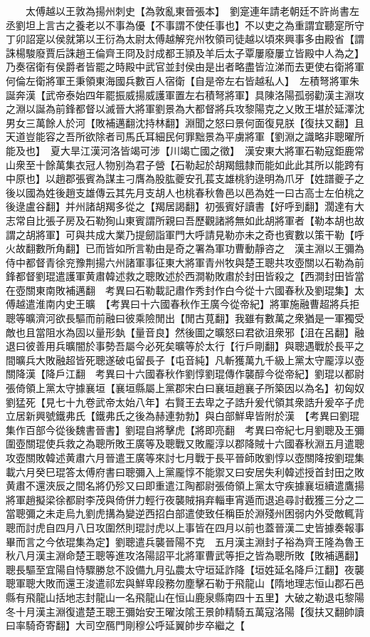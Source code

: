 　　太傅越以王敦為揚州刺史【為敦亂東晉張本】　劉寔連年請老朝廷不許尚書左丞劉坦上言古之養老以不事為優【不事謂不使任事也】不以吏之為重謂宜聽寔所守丁卯詔寔以侯就第以王衍為太尉太傅越解兖州牧領司徒越以頃來興事多由殿省【謂誅楊駿廢賈后誅趙王倫齊王冏及討成都王頴及羊后太子覃屢廢屢立皆殿中人為之】乃奏宿衛有侯爵者皆罷之時殿中武官並封侯由是出者略盡皆泣涕而去更使右衛將軍何倫左衛將軍王秉領東海國兵數百人宿衛【自是帝左右皆越私人】　左積弩將軍朱誕奔漢【武帝泰始四年罷振威揚威護軍置左右積弩將軍】具陳洛陽孤弱勸漢主淵攻之淵以誕為前鋒都督以滅晉大將軍劉景為大都督將兵攻黎陽克之乂敗王堪於延澤沈男女三萬餘人於河【敗補邁翻沈持林翻】淵聞之怒曰景何面復見朕【復扶又翻】且天道豈能容之吾所欲除者司馬氏耳細民何罪黜景為平虜將軍【劉淵之識略非聰曜所能及也】　夏大旱江漢河洛皆竭可涉【川竭亡國之徵】　漢安東大將軍石勒寇鉅鹿常山衆至十餘萬集衣冠人物别為君子營【石勒起於胡羯餓隸而能如此此其所以能跨有中原也】以趙郡張賓為謀主刁膺為股肱夔安孔萇支雄桃豹逯明為爪牙【姓譜夔子之後以國為姓後趙支雄傳云其先月支胡人也桃春秋魯邑以邑為姓一曰古高士左伯桃之後逯盧谷翻】并州諸胡羯多從之【羯居謁翻】初張賓好讀書【好呼到翻】濶達有大志常自比張子房及石勒狥山東賓謂所親曰吾歷觀諸將無如此胡將軍者【勒本胡也故謂之胡將軍】可與共成大業乃提劒詣軍門大呼請見勒亦未之奇也賓數以策干勒【呼火故翻數所角翻】已而皆如所言勒由是奇之署為軍功曹動靜咨之　漢主淵以王彌為侍中都督青徐兖豫荆揚六州諸軍事征東大將軍青州牧與楚王聰共攻壺關以石勒為前鋒都督劉琨遣護軍黄肅韓述救之聰敗述於西澗勒敗肅於封田皆殺之【西澗封田皆當在壺關東南敗補邁翻　考異曰石勒載記肅作秀封作白今從十六國春秋及劉琨集】太傅越遣淮南内史王曠　【考異曰十六國春秋作王廣今從帝紀】將軍施融曹超將兵拒聰等曠濟河欲長驅而前融曰彼乘險閒出【閒古莧翻】我雖有數萬之衆猶是一軍獨受敵也且當阻水為固以量形埶【量音良】然後圖之曠怒曰君欲沮衆邪【沮在呂翻】融退曰彼善用兵曠闇於事勢吾屬今必死矣曠等於太行【行戶剛翻】與聰遇戰於長平之間曠兵大敗融超皆死聰遂破屯留長子【屯音純】凡斬獲萬九千級上黨太守龎淳以壺關降漢【降戶江翻　考異曰十六國春秋作劉惇劉琨傳作襲醇今從帝紀】劉琨以都尉張倚領上黨太守據襄垣【襄垣縣屬上黨郡宋白曰襄垣趙襄子所築因以為名】初匈奴劉猛死【見七十九卷武帝太始八年】右賢王去卑之子誥升爰代領其衆誥升爰卒子虎立居新興號鐵弗氏【鐵弗氏之後為赫連勃勃】與白部鮮卑皆附於漢　【考異曰劉琨集作百部今從後魏書晉書】劉琨自將擊虎【將即亮翻　考異曰帝紀七月劉聰及王彌圍壺關琨使兵救之為聰所敗王廣等及聰戰又敗龎淳以郡降賊十六國春秋淵五月遣聰攻壺關敗韓述黄肅六月晉遣王廣等來討七月戰于長平晉師敗劉惇以壺關降按劉琨集載六月癸巳琨答太傅府書曰聰彌入上黨龎惇不能禦又曰安居失利韓述授首封田之敗黄肅不還浹辰之間名將仍殄又曰即重遣江陶都尉張倚領上黨太守疾據襄垣續遣鷹揚將軍趙擬梁徐都尉李茂與倚併力輕行夜襲賊捐弃輜車宵遁而退追尋討截獲三分之二當聰彌之未走烏九劉虎搆為變逆西招白部遣使致任稱臣於淵殘州困弱内外受敵輒背聰而討虎自四月八日攻圍然則琨討虎以上事皆在四月以前也蓋晉漢二史皆據奏報事畢而言之今依琨集為定】劉聰遣兵襲晉陽不克　五月漢主淵封子裕為齊王隆為魯王　秋八月漢主淵命楚王聰等進攻洛陽詔平北將軍曹武等拒之皆為聰所敗【敗補邁翻】聰長驅至宜陽自恃驟勝怠不設備九月弘農太守垣延詐降【垣姓延名降戶江翻】夜襲聰軍聰大敗而還王浚遣祁宏與鮮卑段務勿塵擊石勒于飛龍山【隋地理志恒山郡石邑縣有飛龍山括地志封龍山一名飛龍山在恒山鹿泉縣南四十五里】大破之勒退屯黎陽　冬十月漢主淵復遣楚王聰王彌始安王曜汝隂王景帥精騎五萬寇洛陽【復扶又翻帥讀曰率騎奇寄翻】大司空鴈門剛穆公呼延翼帥步卒繼之【